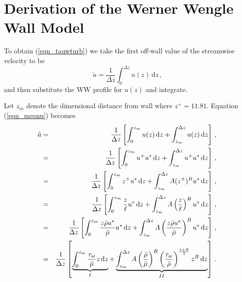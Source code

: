 \chapter{Derivation of the Werner Wengle Wall Model}
\label{app_WWderivation}

To obtain (\ref{eqn_tauwturb}) we take the first off-wall value of the streamwise velocity to be
\begin{equation}
\label{eqn_meanu}
\tilde{u} = \frac{1}{\Delta z} \int_0^{\Delta z} u(z) \,\mbox{d}z \,\mbox{,}
\end{equation}
and then substitute the WW profile for $u(z)$ and integrate.

Let $z_m$ denote the dimensional distance from wall where $z^+ = 11.81$.  Equation (\ref{eqn_meanu}) becomes
\begin{eqnarray}
\label{eqn_uint}
\tilde{u} &=& \frac{1}{\Delta z} \left[ \int_0^{z_m} u(z) \,\mbox{d}z + \int_{z_m}^{\Delta z} u(z) \,\mbox{d}z \right] \,\mbox{,} \nonumber\vspace{0.2cm}\\
&=& \frac{1}{\Delta z} \left[ \int_0^{z_m} u^+ u^* \,\mbox{d}z + \int_{z_m}^{\Delta z} u^+ u^* \,\mbox{d}z \right] \,\mbox{,} \nonumber\vspace{0.2cm}\\
&=& \frac{1}{\Delta z} \left[ \int_0^{z_m} z^+ u^* \,\mbox{d}z + \int_{z_m}^{\Delta z} A(z^+)^B u^* \,\mbox{d}z \right] \,\mbox{,} \nonumber\vspace{0.2cm}\\
&=& \frac{1}{\Delta z} \left[ \int_0^{z_m} \frac{z}{\ell} u^* \,\mbox{d}z + \int_{z_m}^{\Delta z} A\left(\frac{z}{\ell}\right)^B u^* \,\mbox{d}z \right] \,\mbox{,} \nonumber\vspace{0.2cm}\\
&=& \frac{1}{\Delta z} \left[ \int_0^{z_m} \frac{z\bar{\rho}u^*}{\bar{\mu}} u^* \,\mbox{d}z + \int_{z_m}^{\Delta z} A\left(\frac{z\bar{\rho}u^*}{\bar{\mu}}\right)^B u^* \,\mbox{d}z \right] \,\mbox{,} \nonumber\vspace{0.2cm}\\
&=& \frac{1}{\Delta z} \left[ \underbrace{\int_0^{z_m} \frac{\tau_w}{\bar{\mu}} z\,\mbox{d}z}_{I} + \underbrace{\int_{z_m}^{\Delta z} A\left(\frac{\bar{\rho}}{\bar{\mu}}\right)^B \left(\frac{\tau_w}{\bar{\rho}}\right)^{\frac{1+B}{2}} z^B\,\mbox{d}z}_{II} \right] \,\mbox{.}
\end{eqnarray}

